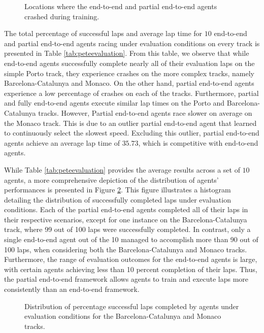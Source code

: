 \begin{figure}[htb!]
    \centering
    
    \caption{Locations where the end-to-end and partial end-to-end agents crashed during training.}
    \label{fig:esp_crashes}
\end{figure}


The total percentage of successful laps and average lap time for $10$ end-to-end and partial end-to-end agents racing under evaluation conditions on every track is presented in Table \ref{tab:peteevaluation}.
From this table, we observe that while end-to-end agents successfully complete nearly all of their evaluation laps on the simple Porto track, they experience crashes on the more complex tracks, namely Barcelona-Catalunya and Monaco.
On the other hand, partial end-to-end agents experience a low percentage of crashes on each of the tracks.
Furthermore, partial and fully end-to-end agents execute similar lap times on the Porto and Barcelona-Catalunya tracks.
However, Partial end-to-end agents race slower on average on the Monaco track.
This is due to an outlier partial end-to-end agent that learned to continuously select the slowest speed.
Excluding this outlier, partial end-to-end agents achieve an average lap time of $35.73$, which is competitive with end-to-end agents. 



While Table \ref{tab:peteevaluation} provides the average results across a set of $10$ agents, 
a more comprehensive depiction of the distribution of agents' performances is presented in Figure \ref{fig:eval_dists}. 
This figure illustrates a histogram detailing the distribution of successfully completed laps under evaluation conditions.
Each of the partial end-to-end agents completed all of their laps in their respective scenarios, 
except for one instance on the Barcelona-Catalunya track, where 99 out of 100 laps were successfully completed. 
In contrast, only a single end-to-end agent out of the 10 managed to accomplish more than 90 out of 100 laps, when considering both the Barcelona-Catalunya and Monaco tracks.
Furthermore, the range of evaluation outcomes for the end-to-end agents is large, with certain agents achieving less than 10 percent completion of their laps. 
Thus, the partial end-to-end framework allows agents to train and execute laps more consistently than an end-to-end framework.


\begin{figure}[htb!]
    \centering
    
    \caption[Distribution of percentage successful laps completed by agents under evaluation conditions]{Distribution of percentage successful laps completed by agents under evaluation conditions for the Barcelona-Catalunya and Monaco tracks.}
    \label{fig:eval_dists}
\end{figure}


